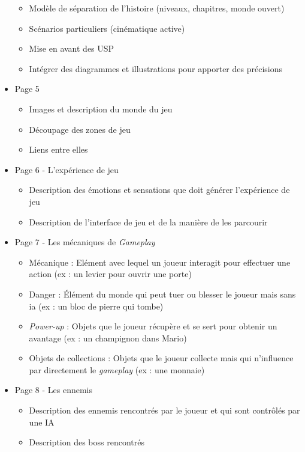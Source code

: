 \begin{itemize}
\begin{itemize}
        \item Modèle de séparation de l'histoire (niveaux, chapitres, monde ouvert)
        \item Scénarios particuliers (cinématique active)
        \item Mise en avant des USP
        \item Intégrer des diagrammes et illustrations pour apporter des précisions
    \end{itemize}
    \item Page 5
    \begin{itemize}
        \item Images et description du monde du jeu
        \item Découpage des zones de jeu
        \item Liens entre elles
    \end{itemize}
    \item Page 6 - L'expérience de jeu
    \begin{itemize}
        \item Description des émotions et sensations que doit générer l'expérience de jeu
        \item Description de l'interface de jeu et de la manière de les parcourir
    \end{itemize}
    \item Page 7 - Les mécaniques de \emph{Gameplay} 
    \begin{itemize}
        \item Mécanique : Elément avec lequel un joueur interagit pour effectuer une action (ex : un levier pour ouvrir une porte)
        \item Danger : Élément du monde qui peut tuer ou blesser le joueur mais sans \gls{ia} (ex : un bloc de pierre qui tombe)
        \item \emph{Power-up} : Objets que le joueur récupère et se sert pour obtenir un avantage (ex : un champignon dans Mario)
        \item Objets de collections : Objets que le joueur collecte mais qui n'influence par directement le \emph{gameplay} (ex : une monnaie)
    \end{itemize}
    \item Page 8 - Les ennemis
    \begin{itemize}
        \item Description des ennemis rencontrés par le joueur et qui sont contrôlés par une IA
        \item Description des boss rencontrés

\end{itemize}
\end{itemize}
